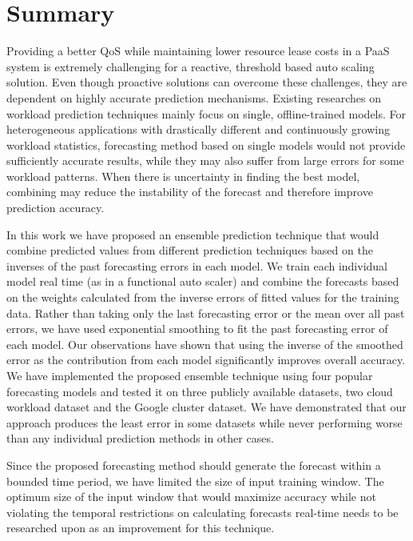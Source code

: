 \section{Summary}

Providing a better QoS while maintaining lower resource lease costs in a PaaS system is extremely challenging for a reactive, threshold based auto scaling solution. Even though proactive solutions can overcome these challenges, they are dependent on highly accurate prediction mechanisms. Existing researches on workload prediction techniques mainly focus on single, offline-trained models. For heterogeneous  applications with drastically different and continuously growing workload statistics, forecasting method based on single models would not provide sufficiently accurate results, while they may also suffer from large errors for some workload patterns. When there is uncertainty in finding the best model, combining may reduce the instability of the forecast and therefore improve prediction accuracy.

In this work we have proposed an ensemble prediction technique that would combine predicted values from different prediction techniques based on the inverses of the past forecasting errors in each model. We train each individual model real time (as in a functional auto scaler) and combine the forecasts based on the weights calculated from the inverse errors of fitted values for the training data. Rather than taking only the last forecasting error or the mean over all past errors, we have used exponential smoothing to fit the past forecasting error of each model. Our observations have shown that using the inverse of the smoothed error as the contribution from each model significantly improves overall accuracy.  We have implemented the proposed ensemble technique using four popular forecasting models and tested it on three publicly available datasets, two cloud workload dataset and the Google cluster dataset.  We have demonstrated that our approach produces the least error in some datasets while never performing worse than any individual prediction methods in other cases.

Since the proposed forecasting method should generate the forecast within a bounded time period, we have limited the size of input training window. The optimum size of the input window that would maximize accuracy while not violating the temporal restrictions on calculating forecasts real-time needs to be researched upon as an improvement for this technique.